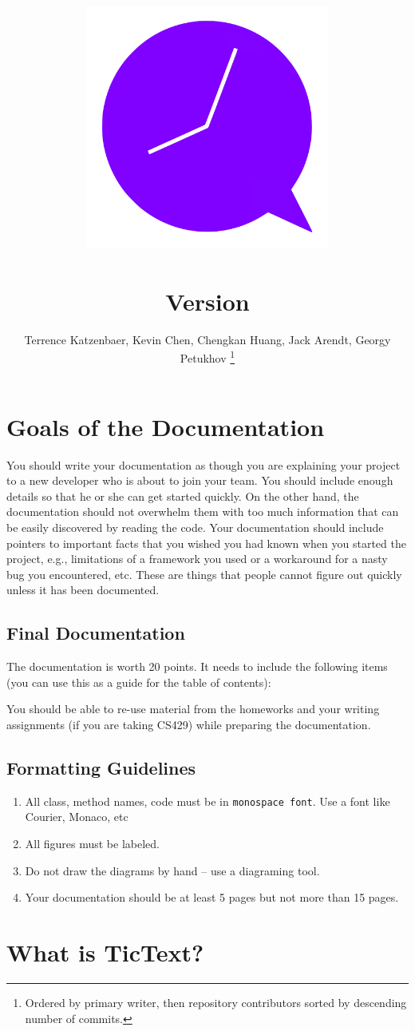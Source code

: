 \documentclass[11pt, titlepage]{article} %
\title{
\includegraphics[width=8cm]{icon}\\
\kDocTitle\\
\large{Version \kDocVersion}
}
\author{
	Terrence Katzenbaer, Kevin Chen, Chengkan Huang, Jack Arendt, Georgy Petukhov
	\footnote{Ordered by primary writer, then repository contributors sorted by descending number of commits.}
}
\begin{document}
\maketitle
\tableofcontents

\clearpage
\section{Goals of the Documentation}
You should write your documentation as though you are explaining your project to a new developer who is about to join your team. You should include enough details so that he or she can get started quickly. On the other hand, the documentation should not overwhelm them with too much information that can be easily discovered by reading the code.
Your documentation should include pointers to important facts that you wished you had known when you started the project, e.g., limitations of a framework you used or a workaround for a nasty bug you encountered, etc. These are things that people cannot figure out quickly unless it has been documented.

\subsection{Final Documentation}
The documentation is worth 20 points. It needs to include the following items (you can use this as a guide for the table of contents):

You should be able to re-use material from the homeworks and your writing assignments (if you are taking CS429) while preparing the documentation.

\subsection{Formatting Guidelines}
\begin{enumerate}
\item All class, method names, code must be in \texttt{monospace font}. Use a font like Courier, Monaco, etc
\item All figures must be labeled.
\item Do not draw the diagrams by hand – use a diagraming tool.
\item Your documentation should be at least 5 pages but not more than 15 pages.
\end{enumerate}

\clearpage
\section{What is TicText?}

\end{document}
